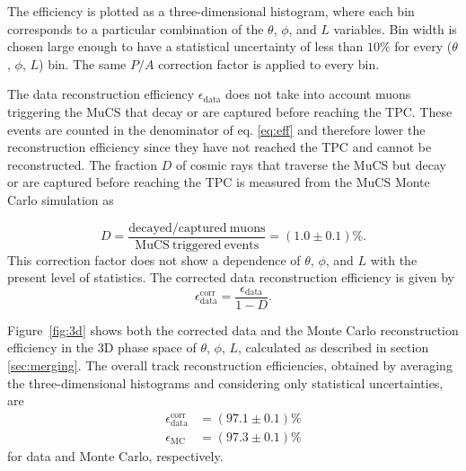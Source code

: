 \documentclass[a4paper,11pt]{article}
\begin{document}
The efficiency is plotted as a three-dimensional histogram, where each bin corresponds to a particular combination of the $\theta$, $\phi$, and $L$ variables. Bin width is chosen large enough to have a statistical uncertainty of less than $10\%$ for every ($\theta$, $\phi$, $L$) bin. The same $P/A$ correction factor is applied to every bin.

The data reconstruction efficiency $\epsilon_{\mathrm{data}}$ does not take into account muons triggering the MuCS that decay or are captured before reaching the TPC. These events are counted in the denominator of eq. \eqref{eq:eff} and therefore lower the reconstruction efficiency since they have not reached the TPC and cannot be reconstructed. The fraction $D$ of cosmic rays that traverse the MuCS but decay or are captured before reaching the TPC is measured from the MuCS Monte Carlo simulation as

\begin{equation}
D = \frac{\mathrm{decayed/captured~muons}}{\mathrm{MuCS~triggered~events}} = (1.0 \pm 0.1)\%.
\end{equation}
This correction factor does not show a dependence of $\theta$, $\phi$, and $L$ with the present level of statistics. The corrected data reconstruction efficiency is given by
\begin{equation}\label{eq:dcorr}
\epsilon_{\mathrm{data}}^{\mathrm{corr}} =  \frac{\epsilon_{\mathrm{data}}}{1-D}.
\end{equation}

Figure~\ref{fig:3d} shows both the corrected data and the Monte Carlo reconstruction efficiency in the 3D phase space of $\theta$, $\phi$, $L$, calculated as described in section \ref{sec:merging}. The overall track reconstruction efficiencies, obtained by averaging the three-dimensional histograms and considering only statistical uncertainties, are
\begin{align}
\epsilon_{\mathrm{data}}^{\mathrm{corr}} &= (97.1 \pm 0.1)\%\\
\epsilon_{\mathrm{MC}} &= (97.3 \pm 0.1)\% \nonumber
\end{align}
for data and Monte Carlo, respectively.
\end{document}
